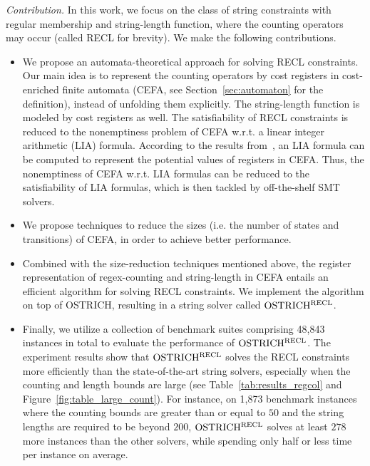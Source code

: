\medskip
\noindent 
\emph{Contribution.} In this work, we focus on the class of string constraints with regular membership and string-length function, where the counting operators may occur (called RECL for brevity). We make the following contributions.
\vspace{-0.5mm}
\begin{itemize}
  \item We propose an automata-theoretical approach for solving RECL constraints. 
  Our main idea is to represent the counting operators by cost registers in cost-enriched finite automata (CEFA, see Section~\ref{sec:automaton} for the definition), instead of unfolding them explicitly. The string-length function is modeled by cost registers as well. The satisfiability of RECL constraints is reduced to the nonemptiness problem of CEFA w.r.t. a linear integer arithmetic (LIA) formula. According to the results from~\cite{atva2020}, an LIA formula can be computed to represent the potential values of registers in CEFA.
Thus, the nonemptiness of CEFA w.r.t. LIA formulas can be reduced to the satisfiability of LIA formulas, which is then tackled by off-the-shelf SMT solvers.
%
  \item We propose techniques to reduce the sizes (i.e. the number of states and transitions) of CEFA, in order to achieve better performance.
  \item Combined with the size-reduction techniques mentioned above, the register representation of regex-counting and string-length in CEFA entails an efficient algorithm for solving RECL constraints. We implement the algorithm on top of OSTRICH, resulting in a string solver called $\rm OSTRICH^{RECL}$. 
  \item Finally, we utilize a collection of benchmark suites comprising 48,843 instances in total to evaluate the performance of $\rm OSTRICH^{RECL}$. The experiment results show that $\rm OSTRICH^{RECL}$ solves the RECL constraints more efficiently than the state-of-the-art string solvers, especially when the counting and length bounds are large (see Table~\ref{tab:results_regcol} and Figure~\ref{fig:table_large_count}). For instance, on 1,873 benchmark instances where the counting bounds are greater than or equal to $50$ and the string lengths are required to be beyond $200$, $\rm OSTRICH^{RECL}$ solves at least $278$ more instances than the other solvers, while spending only half or less time per instance on average. 

\end{itemize}
